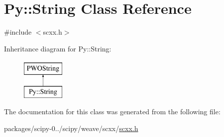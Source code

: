 \hypertarget{classPy_1_1String}{}\section{Py\+:\+:String Class Reference}
\label{classPy_1_1String}


{\ttfamily \#include $<$scxx.\+h$>$}

Inheritance diagram for Py\+:\+:String\+:\begin{figure}[H]
\begin{center}
\leavevmode
\includegraphics[height=2.000000cm]{classPy_1_1String}
\end{center}
\end{figure}


The documentation for this class was generated from the following file\+:\begin{DoxyCompactItemize}
\item 
packages/scipy-\/0../scipy/weave/scxx/\hyperlink{scxx_8h}{scxx.\+h}\end{DoxyCompactItemize}

